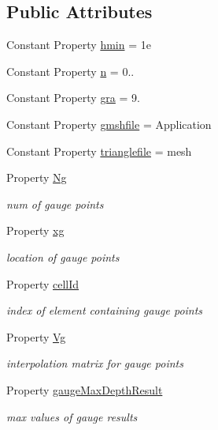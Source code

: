 \subsection*{Public Attributes}
\begin{DoxyCompactItemize}
\item 
Constant Property \hyperlink{class_malpasset2d_a6b7e76c2f9a020a94baaef73488be3d5}{hmin} = 1e
\item 
Constant Property \hyperlink{class_malpasset2d_a1f228c6d0f798ffc5a38af123387caa5}{n} = 0..
\item 
Constant Property \hyperlink{class_malpasset2d_aba7f7cba9dfcdf635cc9d5f30c54a5e5}{gra} = 9.
\item 
Constant Property \hyperlink{class_malpasset2d_ad94b292459d05b032489c47480342713}{gmshfile} = \textquotesingle{}Application
\item 
Constant Property \hyperlink{class_malpasset2d_ab40fe7dd88f25236ff730490538f71ae}{trianglefile} = \textquotesingle{}mesh
\item 
Property \hyperlink{class_malpasset2d_a889ddf0fe6f8c3697c7f0170f60bcea6}{Ng}
\begin{DoxyCompactList}\small\item\em num of gauge points \end{DoxyCompactList}\item 
Property \hyperlink{class_malpasset2d_a4bf273e150a63609562afee5ff0f37e2}{xg}
\begin{DoxyCompactList}\small\item\em location of gauge points \end{DoxyCompactList}\item 
Property \hyperlink{class_malpasset2d_ae2f24f65d4386658ca31dde459c64b90}{cell\+Id}
\begin{DoxyCompactList}\small\item\em index of element containing gauge points \end{DoxyCompactList}\item 
Property \hyperlink{class_malpasset2d_ac1845caf0b00020cd61a3f7c360dbbee}{Vg}
\begin{DoxyCompactList}\small\item\em interpolation matrix for gauge points \end{DoxyCompactList}\item 
Property \hyperlink{class_malpasset2d_a36dd137ae2478d84c2abbf44b451d943}{gauge\+Max\+Depth\+Result}
\begin{DoxyCompactList}\small\item\em max values of gauge results \end{DoxyCompactList}\end{DoxyCompactItemize}
